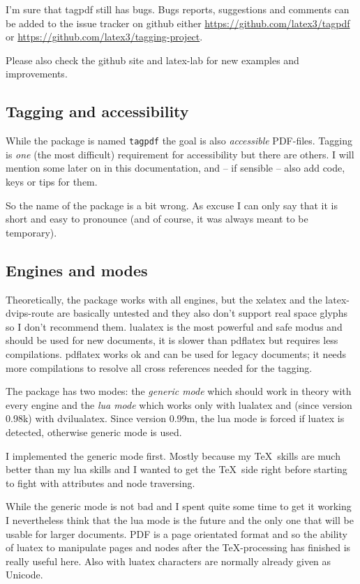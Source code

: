 \documentclass[bibliography=totoc,a4paper]{article}
\newcommand\pkg[1]{\texttt{#1}}
\newcommand\PDF{PDF}
\begin{document}
I'm sure that tagpdf still has bugs. Bugs reports, suggestions and comments 
can be added to the issue tracker on github either 
\url{https://github.com/latex3/tagpdf} or
\url{https://github.com/latex3/tagging-project}. 

Please also check the github site and latex-lab for new examples and improvements.

\subsection{Tagging and accessibility}

While the package is named \pkg{tagpdf} the goal is also \emph{accessible} 
\PDF{}-files. Tagging is \emph{one} (the most difficult) requirement for 
accessibility but there are others. I will mention some later on in this 
documentation, and -- if sensible -- also add code, keys or 
tips for them. 

So the name of the package is a bit wrong. As excuse I can only say that it 
is short and easy to pronounce (and of course, it was always meant to be temporary). 


\subsection{Engines and modes}

Theoretically, the package works with all engines, but the xelatex and the 
latex-dvips-route are basically untested and they also don't support real 
space glyphs so I don't recommend them. lualatex is the most powerful and 
safe modus and should be used for new documents, it is slower than pdflatex 
but requires less compilations. pdflatex works ok and can be used for legacy 
documents; it needs more compilations to resolve all cross references needed 
for the tagging. 

The package has two modes: the \emph{generic mode} which should work in 
theory with every engine and the \emph{lua mode} which works only with 
lualatex and (since version 0.98k) with dvilualatex. Since version 0.99m, 
the lua mode is forced if luatex is detected, otherwise generic mode is used. 

I implemented the generic mode first. Mostly because my \TeX\ skills are much 
better than my lua skills and I wanted to get the \TeX\ side right before 
starting to fight with attributes and node traversing. 

While the generic mode is not bad and I spent quite some time to get it 
working I nevertheless think that the lua mode is the future and the only one 
that will be usable for larger documents. \PDF{} is a page orientated format 
and so the ability of luatex to manipulate pages and nodes after the 
\TeX-processing has finished is really useful here. Also with luatex characters are 
normally already given as Unicode. 
\end{document}

